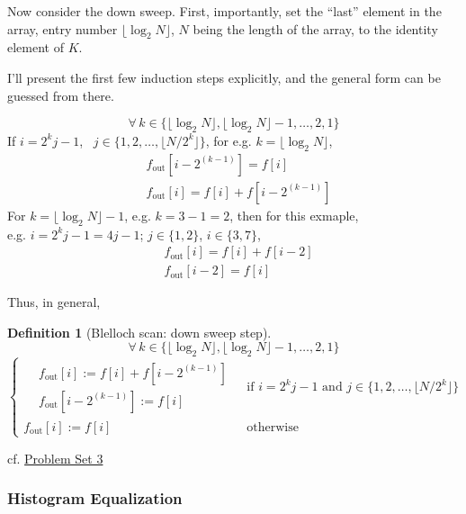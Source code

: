 \documentclass[10pt]{amsart}
\newtheorem{definition}{Definition}
\begin{document}
\begin{multicols*}{2}
Now consider the down sweep.  First, importantly, set the ``last'' element in the array, entry number $\lfloor \log_2{N} \rfloor$, $N$ being the length of the array, to the identity element of $K$.  

I'll present the first few induction steps explicitly, and the general form can be guessed from there.


\[
\forall \, k \in \lbrace \lfloor \log_2N \rfloor , \lfloor \log_2N \rfloor -1, \dots , 2, 1 \rbrace
\]
If $i = 2^kj - 1$, \, $j\in \lbrace 1,2, \dots , \lfloor N/2^k \rfloor \rbrace$, for e.g. $k = \lfloor \log_2N \rfloor$,
\[
\begin{aligned}
  & f_{\text{out}}[i-2^{(k-1)}] = f[i] \\ 
  & f_{\text{out}}[i] = f[i] + f[i-2^{(k-1)} ]
  \end{aligned}
\]
For $k = \lfloor \log_2 N \rfloor -1$, e.g. $k=3-1=2$, then for this exmaple, \\
e.g. $i=2^kj-1 = 4j-1$; $j\in \lbrace 1,2 \rbrace$, $i\in \lbrace 3,7\rbrace$,
\[
\begin{aligned}
  & f_{\text{out}}[i] = f[i] + f[i-2] \\ 
  & f_{\text{out}}[i-2] = f[i]
\end{aligned}
\]

Thus, in general,
\begin{definition}[Blelloch scan: down sweep step]
\[
\forall \, k \in \lbrace \lfloor \log_2N \rfloor , \lfloor \log_2N \rfloor -1, \dots , 2, 1 \rbrace
\]
\begin{equation}
\begin{cases}
\begin{aligned} &   f_{\text{out}}[i] := f[i] + f[i-2^{(k-1)}] \\ 
  & f_{\text{out}}[i-2^{(k-1)}] := f[i] \end{aligned} & \text{ if } i = 2^kj-1 \text{ and } j \in \lbrace 1,2, \dots , \lfloor N/2^k \rfloor \rbrace \\
f_{\text{out}}[i] := f[i]  & \text{ otherwise}
  \end{cases}
\end{equation}
\end{definition}







cf.  \href{https://classroom.udacity.com/courses/cs344/lessons/86719951/concepts/907138050923#}{Problem Set 3} 

\subsubsection*{Histogram Equalization}


\end{multicols*}
\end{document}
